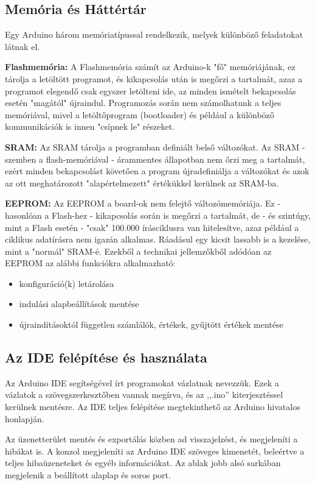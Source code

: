 \documentclass[]{thesis-ekf}
\theoremstyle{definition}
\begin{document}
\subsection{Memória és Háttértár}
Egy Arduino három memóriatípussal rendelkezik, melyek különböző feladatokat látnak el.

\textbf{Flashmemória:} A Flashmemória számít az Arduino-k "fő" memóriájának, ez tárolja a letöltött programot, és kikapcsolás után is megőrzi a tartalmát, azaz a programot elegendő csak egyszer letölteni ide, az minden ismételt bekapcsolás esetén "magától" újraindul. Programozás során nem számolhatunk a teljes memóriával, mivel a letöltőprogram (bootloader) és például a különböző kommunikációk is innen "csípnek le" részeket.

\textbf{SRAM:} Az SRAM tárolja a programban definiált belső változókat. Az SRAM - szemben a flash-memóriával - árammentes állapotban nem őrzi meg a tartalmát, ezért minden bekapcsolást követően a program újradefiniálja a változókat és azok az ott meghatározott "alapértelmezett" értékükkel kerülnek az SRAM-ba.

\textbf{EEPROM:} Az EEPROM a board-ok nem felejtő változómemóriája. Ez - hasonlóan a Flash-hez - kikapcsolás során is megőrzi a tartalmát, de - és szintúgy, mint a Flash esetén - "csak" 100.000 írásciklusra van hitelesítve, azaz például a ciklikus adatírásra nem igazán alkalmas. Ráadásul egy kicsit lassabb is a kezelése, mint a "normál" SRAM-é. Ezekből a technikai jellemzőkből adódóan az EEPROM az alábbi funkciókra alkalmazható:
\begin{itemize}
	\item konfiguráció(k) letárolása
	\item indulási alapbeállítások mentése
	\item újraindításoktól független számlálók, értékek, gyűjtött értékek mentése
\end{itemize}
\subsection{Az IDE felépítése és használata}\label{arduino-IDE}
Az Arduino IDE segítségével írt programokat vázlatnak nevezzük. Ezek a vázlatok a szövegszerkesztőben vannak megírva, és az ,,.ino'' kiterjesztéssel kerülnek mentésre. Az IDE teljes felépítése megtekinthető az Arduino hivatalos honlapján\cite{Arduino IDE}.

Az üzenetterület mentés és exportálás közben ad visszajelzést, és megjeleníti a hibákat is. A konzol megjeleníti az Arduino IDE szöveges kimenetét, beleértve a teljes hibaüzeneteket és egyéb információkat. Az ablak jobb alsó sarkában megjelenik a beállított alaplap és soros port.
\end{document}
